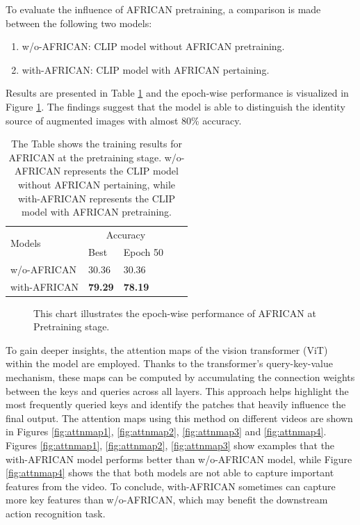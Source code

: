 To evaluate the influence of AFRICAN pretraining, a comparison is made between the following two models: 

\begin{enumerate}
    \item w/o-AFRICAN: CLIP model without AFRICAN pretraining.
    \item with-AFRICAN: CLIP model with AFRICAN pertaining.
\end{enumerate}

Results are presented in Table \ref{tab:africanpretrainingresults} and the epoch-wise performance is visualized in Figure \ref{fig:tp_africanpretraining}. The findings suggest that the model is able to distinguish the identity source of augmented images with almost 80\% accuracy. 

\begin{table}[ht]
    \centering
    \caption[Training Results for AFRICAN at Pretraining stage]{The Table shows the training results for AFRICAN at the pretraining stage. w/o-AFRICAN represents the CLIP model without AFRICAN pertaining, while with-AFRICAN represents the CLIP model with AFRICAN pretraining.
}
    \label{tab:africanpretrainingresults}
    \begin{tabular}{lllll}
        \toprule
        \multirow{2}{*}{Models} & \multicolumn{2}{c}{Accuracy} \\
        \cmidrule{2-3} 
        {} &  Best & Epoch 50\\
        \midrule
        w/o-AFRICAN   & 30.36 & 30.36 \\
        with-AFRICAN  & \textbf{79.29} & \textbf{78.19} \\
        \bottomrule
    \end{tabular}
\end{table}

\begin{figure}[ht]
    \centering
    \resizebox{0.8\textwidth}{!}{}
    \caption[Accuracy of AFRICAN on each Epoch at Pretraining stage]{This chart illustrates the epoch-wise performance of AFRICAN at Pretraining stage.}
    \label{fig:tp_africanpretraining}
\end{figure}

To gain deeper insights, the attention maps of the vision transformer (ViT) within the model are employed. Thanks to the transformer's query-key-value mechanism, these maps can be computed by accumulating the connection weights between the keys and queries across all layers. This approach helps highlight the most frequently queried keys and identify the patches that heavily influence the final output. The attention maps using this method on different videos are shown in Figures \ref{fig:attnmap1}, \ref{fig:attnmap2}, \ref{fig:attnmap3} and \ref{fig:attnmap4}. Figures \ref{fig:attnmap1}, \ref{fig:attnmap2}, \ref{fig:attnmap3} show examples that the with-AFRICAN model performs better than w/o-AFRICAN model, while Figure \ref{fig:attnmap4} shows the that both models are not able to capture important features from the video. To conclude,  with-AFRICAN sometimes can capture more key features than w/o-AFRICAN, which may benefit the downstream action recognition task.


